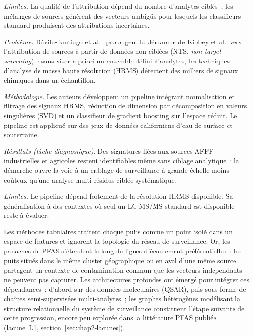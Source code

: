 \emph{Limites.}
La qualit\'e de l'attribution d\'epend du nombre d'analytes cibl\'es~; les m\'elanges de sources g\'en\`erent des vecteurs ambig\"us pour lesquels les classifieurs standard produisent des attributions incertaines.


\label{sec:art-davilasantiago2022}

\emph{Probl\`eme.}
D\'avila-Santiago et al.~\cite{davilasantiago2022} prolongent la d\'emarche de Kibbey et al.\ vers l'attribution de sources \`a partir de donn\'ees non cibl\'ees (NTS, \emph{non-target screening})~: sans viser a priori un ensemble d\'efini d'analytes, les techniques d'analyse de masse haute r\'esolution (HRMS) d\'etectent des milliers de signaux chimiques dans un \'echantillon.

\emph{M\'ethodologie.}
Les auteurs d\'eveloppent un pipeline int\'egrant normalisation et filtrage des signaux HRMS, r\'eduction de dimension par d\'ecomposition en valeurs singuli\`eres (SVD) et un classifieur de gradient boosting sur l'espace r\'eduit.
Le pipeline est appliqu\'e sur des jeux de donn\'ees californiens d'eau de surface et souterraine.

\emph{R\'esultats (t\^ache diagnostique).}
Des signatures li\'ees aux sources AFFF, industrielles et agricoles restent identifiables m\^eme sans ciblage analytique~: la d\'emarche ouvre la voie \`a un criblage de surveillance \`a grande \'echelle moins co\^uteux qu'une analyse multi-r\'esidus cibl\'ee syst\'ematique.

\emph{Limites.}
Le pipeline d\'epend fortement de la r\'esolution HRMS disponible.
Sa g\'en\'eralisation \`a des contextes o\`u seul un LC-MS/MS standard est disponible reste \`a \'evaluer.


\label{sec:chap2-deep}

Les m\'ethodes tabulaires traitent chaque puits comme un point isol\'e dans un espace de features et ignorent la topologie du r\'eseau de surveillance.
Or, les panaches de PFAS s'\'etendent le long de lignes d'\'ecoulement pr\'ef\'erentielles~: les puits situ\'es dans le m\^eme cluster g\'eographique ou en aval d'une m\^eme source partagent un contexte de contamination commun que les vecteurs ind\'ependants ne peuvent pas capturer.
Les architectures profondes ont \'emerg\'e pour int\'egrer ces d\'ependances~: d'abord sur des donn\'ees mol\'eculaires (QSAR), puis sous forme de cha\^ines semi-supervis\'ees multi-analytes~; les graphes h\'et\'erog\`enes mod\'elisant la structure relationnelle du syst\`eme de surveillance constituent l'\'etape suivante de cette progression, encore peu explor\'ee dans la litt\'erature PFAS publi\'ee (lacune~L1, section~\ref{sec:chap2-lacunes}).


